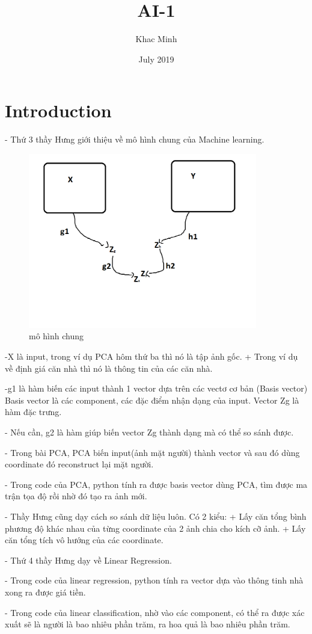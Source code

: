 \documentclass{article}
\title{AI-1}
\author{Khac Minh}
\date{July 2019}
\begin{document}
\maketitle

\section{Introduction}
    - Thứ 3 thầy Hưng giới thiệu về mô hình chung của Machine learning. 
    \begin{figure}[ht]
        \includegraphics[width=10cm]{soDoKhoi.png}
        \caption{mô hình chung}
        \label{fig:figure2}
    \end{figure}
    -X là input, trong ví dụ PCA hôm thứ ba thì nó là tập ảnh gốc.
        + Trong ví dụ về định giá căn nhà thì nó là thông tin của các căn nhà.
        
    -g1 là hàm biến các input thành 1 vector dựa trên các vectơ cơ bản (Basis vector)
        Basis vector là các component, các đặc điểm nhận dạng của input. Vector Zg là hàm đặc trưng.
        
    - Nếu cần, g2 là hàm giúp biến vector Zg thành dạng mà có thể so sánh được. 
    
    - Trong bài PCA, PCA biến input(ảnh mặt người) thành vector và sau đó dùng coordinate đó reconstruct lại mặt người. 
    
    - Trong code của PCA, python tính ra được basis vector dùng PCA, tìm được ma trận tọa độ rồi nhờ đó tạo ra ảnh mới. 
    
    - Thầy Hưng cũng dạy cách so sánh dữ liệu luôn. Có 2 kiểu:
        + Lấy căn tổng bình phương độ khác nhau của từng coordinate của 2 ảnh chia cho kích cỡ ảnh.
        + Lấy căn tổng tích vô hướng của các coordinate. 
    
    - Thứ 4 thầy Hưng dạy về Linear Regression. 
    
    - Trong code của linear regression, python tính ra vector dựa vào thông tinh nhà xong ra được giá tiền.
    
    - Trong code của linear classification, nhờ vào các component, có thể ra được xác xuất sẽ là người là bao nhiêu phần trăm, ra hoa quả là bao nhiêu phần trăm.
\end{document}
